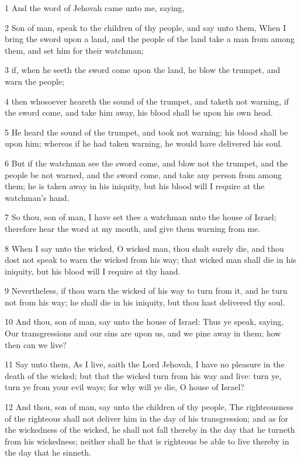 \par 1 And the word of Jehovah came unto me, saying,
\par 2 Son of man, speak to the children of thy people, and say unto them, When I bring the sword upon a land, and the people of the land take a man from among them, and set him for their watchman;
\par 3 if, when he seeth the sword come upon the land, he blow the trumpet, and warn the people;
\par 4 then whosoever heareth the sound of the trumpet, and taketh not warning, if the sword come, and take him away, his blood shall be upon his own head.
\par 5 He heard the sound of the trumpet, and took not warning; his blood shall be upon him; whereas if he had taken warning, he would have delivered his soul.
\par 6 But if the watchman see the sword come, and blow not the trumpet, and the people be not warned, and the sword come, and take any person from among them; he is taken away in his iniquity, but his blood will I require at the watchman's hand.
\par 7 So thou, son of man, I have set thee a watchman unto the house of Israel; therefore hear the word at my mouth, and give them warning from me.
\par 8 When I say unto the wicked, O wicked man, thou shalt surely die, and thou dost not speak to warn the wicked from his way; that wicked man shall die in his iniquity, but his blood will I require at thy hand.
\par 9 Nevertheless, if thou warn the wicked of his way to turn from it, and he turn not from his way; he shall die in his iniquity, but thou hast delivered thy soul.
\par 10 And thou, son of man, say unto the house of Israel: Thus ye speak, saying, Our transgressions and our sins are upon us, and we pine away in them; how then can we live?
\par 11 Say unto them, As I live, saith the Lord Jehovah, I have no pleasure in the death of the wicked; but that the wicked turn from his way and live: turn ye, turn ye from your evil ways; for why will ye die, O house of Israel?
\par 12 And thou, son of man, say unto the children of thy people, The righteousness of the righteous shall not deliver him in the day of his transgression; and as for the wickedness of the wicked, he shall not fall thereby in the day that he turneth from his wickedness; neither shall he that is righteous be able to live thereby in the day that he sinneth.
